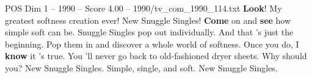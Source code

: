 \begin{textsample}{POS Dim 1 – 1990 – Score 4.00 – 1990/tv\_com\_1990\_114.txt}  \label{ex:f1_pos_059}
\textbf{Look}!
My greatest softness creation ever!
New Snuggle Singles! \textbf{Come} on and \textbf{see} how simple soft can be.
Snuggle Singles pop out individually.
And that 's just the beginning.
Pop them in and discover a whole world of softness.
Once you do, I \textbf{know} it 's true.
You 'll never go back to old-fashioned dryer sheets.
Why should you?
New Snuggle Singles.
Simple, single, and soft.
New Snuggle Singles.

\end{textsample}
